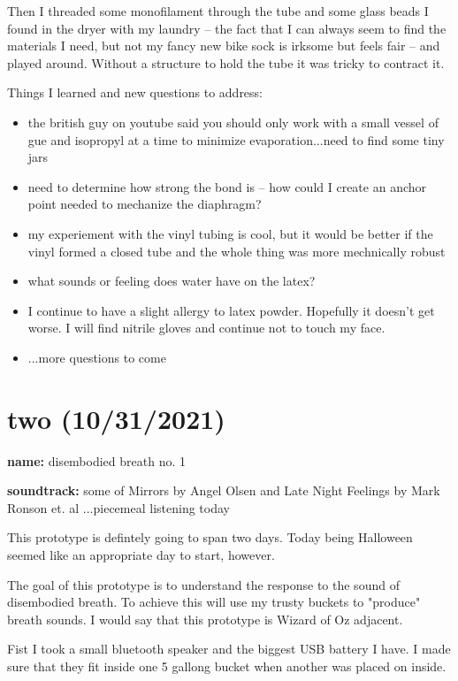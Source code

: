 \documentclass[11pt]{report}
\begin{document}
Then I threaded some monofilament through the tube and some glass beads I found in the dryer with my laundry -- the fact that I can always seem to find the materials I need, but not my fancy new bike sock is irksome but feels fair -- and played around. Without a structure to hold the tube it was tricky to contract it. 



Things I learned and new questions to address:
\begin{itemize}
\item
the british guy on youtube said you should only work with a small vessel of gue and isopropyl at a time to minimize evaporation...need to find some tiny jars
\item
need to determine how strong the bond is -- how could I create an anchor point needed to mechanize the diaphragm?
\item
my experiement with the vinyl tubing is cool, but it would be better if the vinyl formed a closed tube and the whole thing was more mechnically robust
\item
what sounds or feeling does water have on the latex?
\item
I continue to have a slight allergy to latex powder. Hopefully it doesn't get worse. I will find nitrile gloves and continue not to touch my face.
\item
...more questions to come
\end{itemize}


\clearpage
\section*{two (10/31/2021)}

\textbf{name:} disembodied breath no. 1

\textbf{soundtrack:} some of Mirrors by Angel Olsen and Late Night Feelings by Mark Ronson et. al ...piecemeal listening today

This prototype is defintely going to span two days. Today being Halloween seemed like an appropriate day to start, however.

The goal of this prototype is to understand the response to the sound of disembodied breath. To achieve this will use my trusty buckets to "produce" breath sounds. I would say that this prototype is Wizard of Oz adjacent.

Fist I took a small bluetooth speaker and the biggest USB battery I have. I made sure that they fit inside one 5 gallong bucket when another was placed on inside. 
\end{document}
